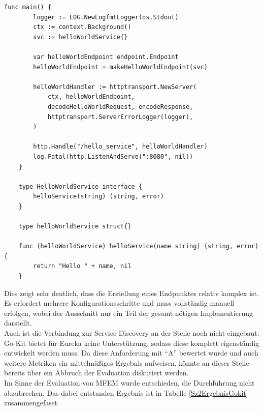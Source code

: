 \begin{lstlisting}[caption={"Hello-Word" in Go-Kit},label=HelloGo,language=Golang] 
	func main() {
		logger := LOG.NewLogfmtLogger(os.Stdout)
		ctx := context.Background()
		svc := helloWorldService{}
		
		var helloWorldEndpoint endpoint.Endpoint
		helloWorldEndpoint = makeHelloWorldEndpoint(svc)
		
		helloWorldHandler := httptransport.NewServer(
			ctx, helloWorldEndpoint, 
			decodeHelloWorldRequest, encodeResponse,
			httptransport.ServerErrorLogger(logger),
		)
		
		http.Handle("/hello_service", helloWorldHandler)
		log.Fatal(http.ListenAndServe(":8080", nil))
	}
	
	type HelloWorldService interface {
		helloService(string) (string, error)
	}
	
	type helloWorldService struct{}
	
	func (helloWorldService) helloService(name string) (string, error) {
		return "Hello " + name, nil
	}
\end{lstlisting}

Dies zeigt sehr deutlich, dass die Erstellung eines Endpunktes relativ komplex ist. Es erfordert mehrere Konfigurationsschritte und muss vollständig manuell erfolgen, wobei der Ausschnitt nur ein Teil der gesamt nötigen Implementierung darstellt.\\
Auch ist die Verbindung zur Service Discovery an der Stelle noch nicht eingebaut. Go-Kit bietet für Eureka keine Unterstützung, sodass diese komplett eigenständig entwickelt werden muss. Da diese Anforderung mit \enquote{A} bewertet wurde und auch weitere Metriken ein mittelmäßiges Ergebnis aufweisen, könnte an dieser Stelle bereits über ein Abbruch der Evaluation diskutiert werden.\\
Im Sinne der Evaluation von \ac{MFEM} wurde entschieden, die Durchführung nicht abzubrechen. Das dabei entstanden Ergebnis ist in Tabelle \ref{Sz2ErgebnisGokit} zusammengefasst.

